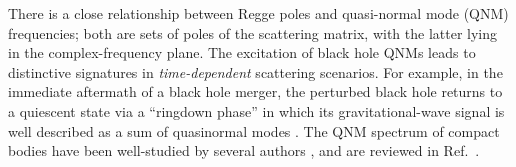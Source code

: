 \documentclass[aps,prd,longbibliography,reprint,twocolumn,amsmath,amssymb,amsfonts,showpacs,footnote,superscriptaddress]{revtex4-1}%
\begin{document}
There is a close relationship between Regge poles and quasi-normal mode (QNM) frequencies; both are sets of poles of the scattering matrix, with the latter lying in the complex-frequency plane. The excitation of black hole QNMs leads to distinctive signatures in \emph{time-dependent} scattering scenarios. For example, in the immediate aftermath of a black hole merger, the perturbed black hole returns to a quiescent state via a ``ringdown phase'' in which its gravitational-wave signal is well described as a sum of quasinormal modes \cite{Giesler:2019uxc}. The QNM spectrum of compact bodies have been well-studied by several authors  \cite{Detweiler:1985zz, Kokkotas:1986gd, Chandrasekhar449, Kokkotas:1992ka, Leins:1993zz, Andersson:1995ez, Andersson1996}, and are reviewed in Ref.~\cite{Kokkotas:1999bd}.

\end{document}

